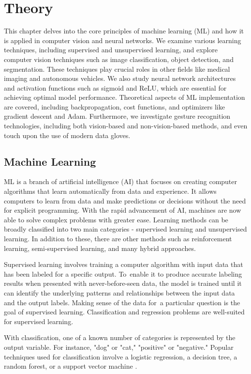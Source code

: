 \chapter{Theory}
This chapter delves into the core principles of machine learning (ML) and how it is applied in computer vision and neural networks. We examine various learning techniques, including supervised and unsupervised learning, and explore computer vision techniques such as image classification, object detection, and segmentation. These techniques play crucial roles in other fields like medical imaging and autonomous vehicles. We also study neural network architectures and activation functions such as sigmoid and ReLU, which are essential for achieving optimal model performance. Theoretical aspects of ML implementation are covered, including backpropagation, cost functions, and optimizers like gradient descent and Adam. Furthermore, we investigate gesture recognition technologies, including both vision-based and non-vision-based methods, and even touch upon the use of modern data gloves.


\section{Machine Learning}
ML is a branch of artificial intelligence (AI) that focuses on creating computer algorithms that learn automatically from data and experience. It allows computers to learn from data and make predictions or decisions without the need for explicit programming.
With the rapid advancement of AI, machines are now able to solve complex problems with greater ease. \cite{nielsenneural} Learning methods can be broadly classified into two main categories - supervised learning and unsupervised learning. In addition to these, there are other methods such as reinforcement learning, semi-supervised learning, and many hybrid approaches.

Supervised learning involves training a computer algorithm with input data that has been labeled for a specific output. To enable it to produce accurate labeling results when presented with never-before-seen data, the model is trained until it can identify the underlying patterns and relationships between the input data and the output labels. Making sense of the data for a particular question is the goal of supervised learning. Classification and regression problems are well-suited for supervised learning. 


With classification, one of a known number of categories is represented by the output variable. For instance, "dog" or "cat," "positive" or "negative." Popular techniques used for classification involve a logistic regression, a decision tree, a random forest, or a support vector machine \cite{decisiontree}.


